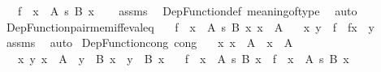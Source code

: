 \begin{isabellebody}
\ \ \ {\isachardoublequoteopen}f\ {\isacharcolon}{\kern0pt}\ {\isacharparenleft}{\kern0pt}x\ {\isacharcolon}{\kern0pt}\ A{\isacharparenright}{\kern0pt}\ {\isasymrightarrow}s\ B{\isacharprime}{\kern0pt}\ x{\isachardoublequoteclose}\isanewline
%
\isadelimproof
\ \ %
\endisadelimproof
%
\isatagproof
{}\isamarkupfalse%
\ assms\ \isamarkupfalse%
\ Dep{\isacharunderscore}{\kern0pt}Function{\isacharunderscore}{\kern0pt}def\ meaning{\isacharunderscore}{\kern0pt}of{\isacharunderscore}{\kern0pt}type\ \isamarkupfalse%
\ auto%
\endisatagproof
{\isafoldproof}%
%
\isadelimproof
\isanewline
%
\endisadelimproof
\isanewline
{}\isamarkupfalse%
\ Dep{\isacharunderscore}{\kern0pt}Function{\isacharunderscore}{\kern0pt}pair{\isacharunderscore}{\kern0pt}mem{\isacharunderscore}{\kern0pt}iff{\isacharunderscore}{\kern0pt}eval{\isacharunderscore}{\kern0pt}eq{\isacharcolon}{\kern0pt}\isanewline
\ \ \ {\isachardoublequoteopen}f\ {\isacharcolon}{\kern0pt}\ {\isacharparenleft}{\kern0pt}x\ {\isacharcolon}{\kern0pt}\ A{\isacharparenright}{\kern0pt}\ {\isasymrightarrow}s\ B\ x{\isachardoublequoteclose}\ {\isachardoublequoteopen}x\ {\isacharcolon}{\kern0pt}\ A{\isachardoublequoteclose}\isanewline
\ \ \ {\isachardoublequoteopen}{\isasymlangle}x{\isacharcomma}{\kern0pt}\ y{\isasymrangle}\ {\isasymin}\ f\ {\isasymlongleftrightarrow}\ f{\isacharbackquote}{\kern0pt}x\ {\isacharequal}{\kern0pt}\ y{\isachardoublequoteclose}\isanewline
%
\isadelimproof
\ \ %
\endisadelimproof
%
\isatagproof
{}\isamarkupfalse%
\ assms\ \isamarkupfalse%
\ auto%
\endisatagproof
{\isafoldproof}%
%
\isadelimproof
\isanewline
%
\endisadelimproof
\isanewline
{}\isamarkupfalse%
\ Dep{\isacharunderscore}{\kern0pt}Function{\isacharunderscore}{\kern0pt}cong\ {\isacharbrackleft}{\kern0pt}cong{\isacharbrackright}{\kern0pt}{\isacharcolon}{\kern0pt}\isanewline
\ \ \ {\isachardoublequoteopen}{\isasymAnd}x{\isachardot}{\kern0pt}\ x\ {\isacharcolon}{\kern0pt}\ A\ {\isasymlongleftrightarrow}\ x\ {\isacharcolon}{\kern0pt}\ A{\isacharprime}{\kern0pt}{\isachardoublequoteclose}\isanewline
\ \ \ {\isachardoublequoteopen}{\isasymAnd}x\ y{\isachardot}{\kern0pt}\ x\ {\isacharcolon}{\kern0pt}\ A\ {\isasymLongrightarrow}\ y\ {\isacharcolon}{\kern0pt}\ B\ x\ {\isasymlongleftrightarrow}\ y\ {\isacharcolon}{\kern0pt}\ B{\isacharprime}{\kern0pt}\ x{\isachardoublequoteclose}\isanewline
\ \ \ {\isachardoublequoteopen}f\ {\isacharcolon}{\kern0pt}\ {\isacharparenleft}{\kern0pt}x\ {\isacharcolon}{\kern0pt}\ A{\isacharparenright}{\kern0pt}\ {\isasymrightarrow}s\ B\ x\ {\isasymlongleftrightarrow}\ f\ {\isacharcolon}{\kern0pt}\ {\isacharparenleft}{\kern0pt}x\ {\isacharcolon}{\kern0pt}\ A{\isacharprime}{\kern0pt}{\isacharparenright}{\kern0pt}\ {\isasymrightarrow}s\ B{\isacharprime}{\kern0pt}\ x{\isachardoublequoteclose}\isanewline

\end{isabellebody}
